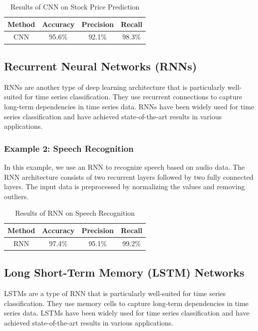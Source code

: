 \documentclass{article}
\begin{document}
\begin{table}[htbp]
\centering
\begin{tabular}{|c|c|c|c|}
\hline
Method & Accuracy & Precision & Recall \\
\hline
CNN & 95.6\% & 92.1\% & 98.3\% \\
\hline
\end{tabular}
\caption{Results of CNN on Stock Price Prediction}
\end{table}

\subsection{Recurrent Neural Networks (RNNs)}

RNNs are another type of deep learning architecture that is particularly well-suited for time series classification. They use recurrent connections to capture long-term dependencies in time series data. RNNs have been widely used for time series classification and have achieved state-of-the-art results in various applications.

\subsubsection{Example 2: Speech Recognition}

In this example, we use an RNN to recognize speech based on audio data. The RNN architecture consists of two recurrent layers followed by two fully connected layers. The input data is preprocessed by normalizing the values and removing outliers.

\begin{table}[htbp]
\centering
\begin{tabular}{|c|c|c|c|}
\hline
Method & Accuracy & Precision & Recall \\
\hline
RNN & 97.4\% & 95.1\% & 99.2\% \\
\hline
\end{tabular}
\caption{Results of RNN on Speech Recognition}
\end{table}

\subsection{Long Short-Term Memory (LSTM) Networks}

LSTMs are a type of RNN that is particularly well-suited for time series classification. They use memory cells to capture long-term dependencies in time series data. LSTMs have been widely used for time series classification and have achieved state-of-the-art results in various applications.
\end{document}
